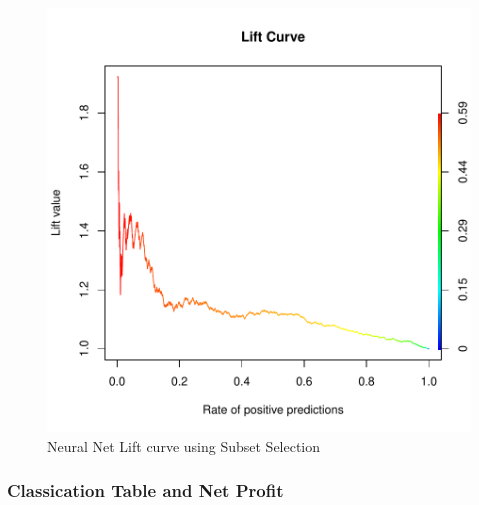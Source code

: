 \documentclass{article}
\begin{document}
\begin{figure}
\begin{center}
\begin{Schunk}
\end{Schunk}
\includegraphics{DirectMailPrediction-023}
\end{center}
\caption{Neural Net Lift curve using Subset Selection}
\label{nn-lift-a}
\end{figure}

\subsubsection*{Classication Table and Net Profit}
\end{document}
